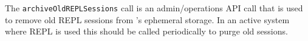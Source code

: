 The \verb+archiveOldREPLSessions+ call is an admin/operations API call that is used to remove
old \Reflex REPL sessions from \Rapture's ephemeral storage. In an active system where REPL is used
this should be called periodically to purge old sessions.
